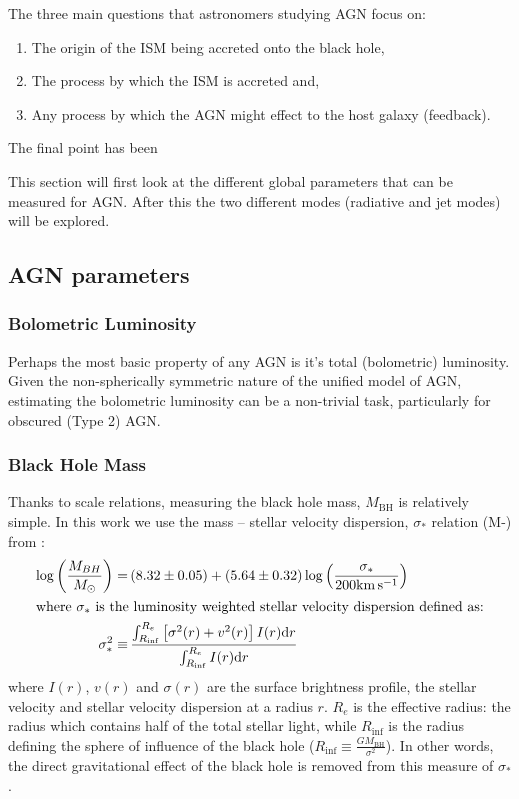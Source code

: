 	The three main questions that astronomers studying AGN focus on:
	\begin{enumerate}
		\item The origin of the ISM being accreted onto the black hole,
		\item The process by which the ISM is accreted and,
		\item Any process by which the AGN might effect to the host galaxy (feedback).
	\end{enumerate}
	The final point has been 

	This section will first look at the different global parameters that can be measured for AGN. After this the two different modes (radiative and jet modes) will be explored.

	\subsection{AGN parameters}
		\label{subsec:introAGNparams}

		\subsubsection{Bolometric Luminosity}
			Perhaps the most basic property of any AGN is it's total (bolometric) luminosity. Given the non-spherically symmetric nature of the unified model of AGN, estimating the bolometric luminosity can be a non-trivial task, particularly for obscured (Type 2) AGN. 

		\subsubsection{Black Hole Mass}
			Thanks to scale relations, measuring the black hole mass, $M_\mathrm{BH}$ is relatively simple. In this work we use the mass -- stellar velocity dispersion, $\sigma_\ast$ relation (M-\textsigma) from \citet{McConnell2013}:
			\begin{align}
				\log\left(\frac{M_{BH}}{M_\odot}\right) = & \, (8.32 \pm 0.05) + (5.64 \pm 0.32) \log\left(\frac{\sigma_\ast}{200 \mathrm{km \, s^{-1}}}\right) \\
				\intertext{where $\sigma_\ast$ is the luminosity weighted stellar velocity dispersion defined as:} 
				\sigma_\ast^2 \equiv & \, \frac{\int_{R_\mathrm{inf}}^{R_e} \left[\sigma^2(r) + v^2(r)\right] I(r) \mathrm{d}r}{\int_{R_\mathrm{inf}}^{R_e} I(r) \mathrm{d}r}
			\end{align}
			where $I(r)$, $v(r)$ and $\sigma(r)$ are the surface brightness profile, the stellar velocity and stellar velocity dispersion at a radius $r$. $R_e$ is the effective radius: the radius which contains half of the total stellar light, while $R_\mathrm{inf}$ is the radius defining the sphere of influence of the black hole ($R_\mathrm{inf} \equiv \frac{GM_\mathrm{BH}}{\sigma^2}$). In other words, the direct gravitational effect of the black hole is removed from this measure of $\sigma_\ast$. %


